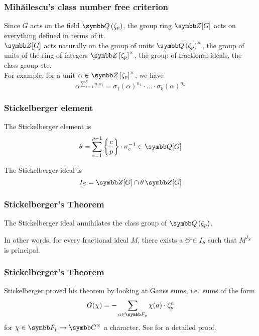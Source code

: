 \begin{frame}
\frametitle{Mihăilescu's class number free criterion}

Since \(G\) acts on the field \(\rationals\left(\zeta_p\right)\), the group ring \(\integers[G]\) acts on everything defined in terms of it. \\[1em]

\(\integers[G]\) acts naturally on the group of units \(\rationals\left(\zeta_p\right)^{\times}\), the group of units of the ring of integers \(\integers\left[\zeta_p\right]^{\times}\), the group of fractional ideals, the class group etc. \\[1em]

For example, for a unit \(\alpha \in \integers\left[\zeta_p\right]^{\times}\), we have
\[
    \alpha^{\sum_{i = 1}^{k} n_i \sigma_i} = \sigma_1 (\alpha)^{n_1} \cdot \hdots \cdot \sigma_k (\alpha)^{n_k}
\]
\end{frame}

\begin{frame}
\frametitle{Stickelberger element}

\begin{definition}
The Stickelberger element is
\[
    \theta = \sum_{c = 1}^{p - 1} \left\{\frac{c}{p}\right\} \cdot \sigma_{c}^{-1} \in \rationals[G]
\]
\end{definition}
\begin{definition}
The Stickelberger ideal is
\[
    I_{S} = \integers[G] \cap \theta \, \integers[G]
\]
\end{definition}
\end{frame}

\begin{frame}
\frametitle{Stickelberger's Theorem}

\begin{theorem}[Stickelberger, 1890]
The Stickelberger ideal annihilates the class group of \(\rationals\left(\zeta_p\right)\).
\end{theorem}

\vspace{1em}

In other words, for every fractional ideal \(M\), there exists a \(\Theta \in I_S\) such that \(M^{I_S}\) is principal.
\end{frame}

\begin{frame}
\frametitle{Stickelberger's Theorem}

Stickelberger proved his theorem by looking at Gauss sums, i.e.\ sums of the form
\[
    G(\chi) = -\sum_{a \in \finitefield{p}} \chi(a) \cdot \zeta_p^{a}
\]
for \(\chi \in \finitefield{p} \to \complex^{\times}\) a character. See \cite{Washington1997} for a detailed proof.
\end{frame}

